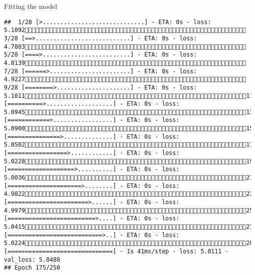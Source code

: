 \documentclass[
  ignorenonframetext,
]{beamer}
\begin{document}
\begin{frame}[fragile]{Fitting the model}
\begin{verbatim}
##  1/28 [>.............................] - ETA: 0s - loss: 5.1092 3/28 [==>...........................] - ETA: 0s - loss: 4.7803 5/28 [====>.........................] - ETA: 0s - loss: 4.8139 7/28 [======>.......................] - ETA: 0s - loss: 4.9227 9/28 [========>.....................] - ETA: 0s - loss: 5.101111/28 [==========>...................] - ETA: 0s - loss: 5.094513/28 [============>.................] - ETA: 0s - loss: 5.090015/28 [===============>..............] - ETA: 0s - loss: 5.050217/28 [=================>............] - ETA: 0s - loss: 5.022819/28 [===================>..........] - ETA: 0s - loss: 5.003621/28 [=====================>........] - ETA: 0s - loss: 4.982223/28 [=======================>......] - ETA: 0s - loss: 4.997925/28 [=========================>....] - ETA: 0s - loss: 5.041527/28 [===========================>..] - ETA: 0s - loss: 5.022428/28 [==============================] - 1s 41ms/step - loss: 5.0111 - val_loss: 5.0488
## Epoch 175/250

\end{verbatim}
\end{frame}
\end{document}
